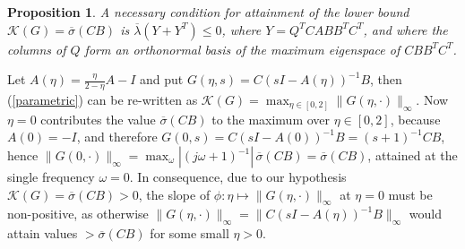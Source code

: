 \documentclass[12pt, a4paper,reqno]{amsart}
\newtheorem{proposition}{\bf Proposition}
\renewenvironment{proof}{\noindent {\bf Proof: }}{\rm\\}
\theoremstyle{definition}
\begin{document}
\begin{proposition}
\label{lb}
    A necessary condition for attainment of the lower bound $\mathcal K(G)=\overline{\sigma}(CB)$ is
    $\overline{\lambda}(Y+Y^T) \leq 0$, where $Y =Q^TCABB^TC^T$, and where the columns of $Q$ form an orthonormal basis of the maximum eigenspace of
    $CBB^TC^T$.
\end{proposition}

\begin{proof}
Let $A(\eta) = \frac{\eta}{2-\eta}A-I$ and put $G(\eta,s) = C(sI-A(\eta))^{-1}B$,
then (\ref{parametric}) can be re-written as $\mathcal K(G) = \max_{\eta \in [0,2]} \|G(\eta,\cdot)\|_\infty$. 
Now 
$\eta=0$ contributes the value $\overline{\sigma}(CB)$ to the maximum over $\eta\in [0,2]$, 
because
$A(0)=-I$, and therefore $G(0,s) = C(sI-A(0))^{-1}B = (s+1)^{-1}CB$, hence
$\|G(0,\cdot)\|_\infty = \max_\omega |(j\omega+1)^{-1}|\,\overline{\sigma}(CB) = \overline{\sigma}(CB)$, attained at the single frequency $\omega=0$.
In consequence,
due to our hypothesis $\mathcal K(G)=\overline{\sigma}(CB) > 0$,
the slope of
$\phi:\eta \mapsto \|G(\eta,\cdot)\|_\infty$ at $\eta = 0$ must be non-positive, as otherwise $\|G(\eta,\cdot)\|_\infty=\|C(sI-A(\eta))^{-1}B\|_\infty$
would attain values $> \overline{\sigma}(CB)$ for some small $\eta > 0$. 


\end{proof}
\end{document}
